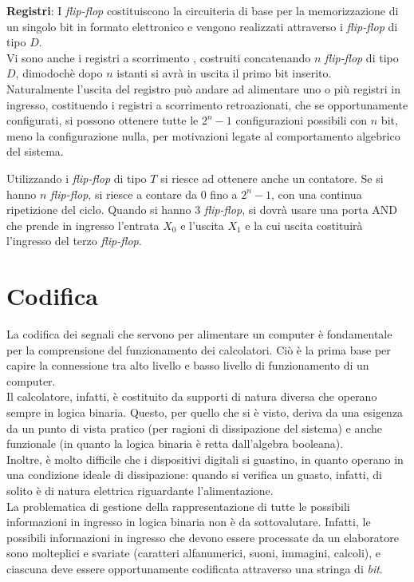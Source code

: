 \documentclass[a4paper]{extarticle}
\begin{document}
\vspace{1em}
\noindent
\textbf{Registri}: I \textit{flip-flop} costituiscono la circuiteria di base per la memorizzazione di un singolo bit in formato elettronico e vengono realizzati attraverso i \textit{flip-flop} di tipo \(D\).\\
Vi sono anche i registri a scorrimento , costruiti concatenando \(n\) \textit{flip-flop} di tipo \(D\), dimodochè dopo \(n\) istanti si avrà in uscita il primo bit inserito.\\
Naturalmente l'uscita del registro può andare ad alimentare uno o più registri in ingresso, costituendo i registri a scorrimento retroazionati, che se opportunamente configurati, si possono ottenere tutte le \(2^n - 1\) configurazioni possibili con \(n\) bit, meno la configurazione nulla, per motivazioni legate al comportamento algebrico del sistema.

\vspace{1em}
\noindent
Utilizzando i \textit{flip-flop} di tipo \(T\) si riesce ad ottenere anche un contatore. Se si hanno \(n\) \textit{flip-flop}, si riesce a contare da \(0\) fino a \(2^n - 1\), con una continua ripetizione del ciclo.
Quando si hanno \(3\) \textit{flip-flop}, si dovrà usare una porta AND che prende in ingresso l'entrata \(X_0\) e l'uscita \(X_1\) e la cui uscita costituirà l'ingresso del terzo \textit{flip-flop}.

\newpage
\section{Codifica}
La codifica dei segnali che servono per alimentare un computer è fondamentale per la comprensione del funzionamento dei calcolatori. Ciò è la prima base per capire la connessione tra alto livello e basso livello di funzionamento di un computer.\\
Il calcolatore, infatti, è costituito da supporti di natura diversa che operano sempre in logica binaria. Questo, per quello che si è visto, deriva da una esigenza da un punto di vista pratico (per ragioni di dissipazione del sistema) e anche funzionale (in quanto la logica binaria è retta dall'algebra booleana).\\
Inoltre, è molto difficile che i dispositivi digitali si guastino, in quanto operano in una condizione ideale di dissipazione: quando si verifica un guasto, infatti, di solito è di natura elettrica riguardante l'alimentazione.\\
La problematica di gestione della rappresentazione di tutte le possibili informazioni in ingresso in logica binaria non è da sottovalutare. Infatti, le possibili informazioni in ingresso che devono essere processate da un elaboratore sono molteplici e svariate (caratteri alfanumerici, suoni, immagini, calcoli), e ciascuna deve essere opportunamente codificata attraverso una stringa di \textit{bit}.
\end{document}
